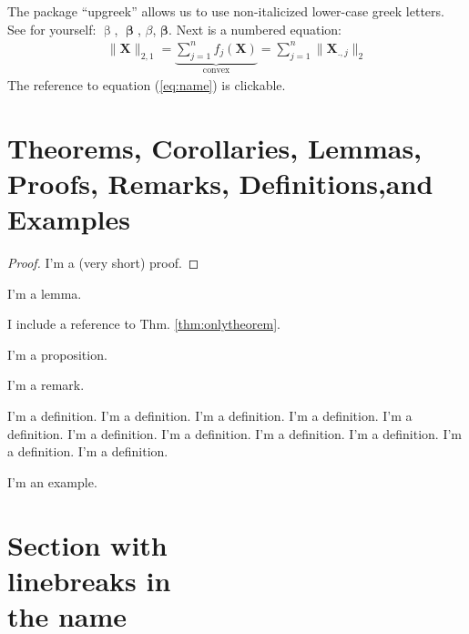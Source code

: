 The package ``upgreek'' allows us to use non-italicized lower-case greek letters. See for yourself: $\upbeta$, $\bm\upbeta$, $\beta$, $\bm\beta$. Next is a numbered equation:
\begin{align}
  \label{eq:name}
  \|\bm{X}\|_{2,1}={\underbrace{\sum_{j=1}^nf_j(\bm{X})}_{\text{convex}}}=\sum_{j=1}^n\|\bm{X}_{.,j}\|_2
\end{align}
The reference to equation (\ref{eq:name}) is clickable.
\section[Theorems, Corollaries, Lemmas, Proofs, Remarks, Definitions and Examples]{Theorems, Corollaries, Lemmas, Proofs, Remarks, Definitions,and Examples}

\begin{theorem}
  \label{thm:onlytheorem}
  \blindtext
\end{theorem}

\begin{proof}
  I'm a (very short) proof.
\end{proof}

\begin{lemma}
  I'm a lemma.
\end{lemma}

\begin{corollary}
  I include a reference to Thm. \ref{thm:onlytheorem}.
\end{corollary}

\begin{proposition}
  I'm a proposition.
\end{proposition}

\begin{remark}
  I'm a remark.
\end{remark}

\begin{definition}
  I'm a definition. I'm a definition. I'm a definition. I'm a definition. I'm a definition. I'm a definition. I'm a definition. I'm a definition. I'm a definition. I'm a definition. I'm a definition.
\end{definition}

\begin{example}
  I'm an example.
\end{example}


\section[Optional table of contents heading]{Section with\\ linebreaks in\\the
  name}


\Blindtext[2]
